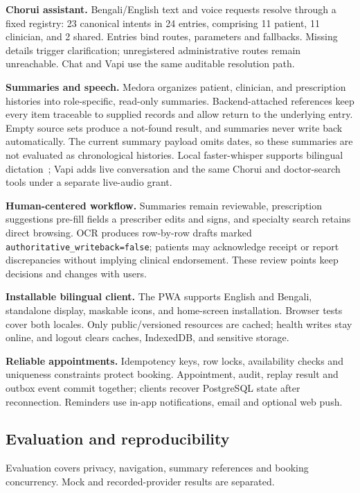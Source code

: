 \documentclass[preprint,12pt,a4paper]{elsarticle}
\begin{document}
\textbf{Chorui assistant.} Bengali/English text and voice requests resolve through a fixed
registry: 23 canonical intents in 24 entries, comprising 11 patient, 11
clinician, and 2 shared. Entries bind routes, parameters and fallbacks. Missing details
trigger clarification; unregistered administrative routes remain unreachable.
Chat and Vapi use the same auditable resolution path.

\textbf{Summaries and speech.} Medora organizes patient, clinician, and prescription
histories into role-specific, read-only summaries. Backend-attached references keep every
item traceable to supplied records and allow return to the underlying entry. Empty source
sets produce a not-found result, and summaries never write back automatically. The current
summary payload omits dates, so these summaries are not evaluated as chronological histories. Local
faster-whisper supports bilingual dictation~\cite{whisper}; Vapi adds live conversation and
the same Chorui and doctor-search tools under a separate live-audio grant.

\textbf{Human-centered workflow.} Summaries remain reviewable, prescription suggestions
pre-fill fields a prescriber edits and signs, and specialty search retains direct browsing.
OCR produces row-by-row drafts marked \texttt{authoritative\_writeback=false}; patients may
acknowledge receipt or report discrepancies without implying clinical endorsement. These
review points keep decisions and changes with users.

\textbf{Installable bilingual client.} The PWA supports English and Bengali, standalone
display, maskable icons, and home-screen installation. Browser tests cover both locales.
Only public/versioned resources are cached; health writes stay online, and logout clears
caches, IndexedDB, and sensitive storage.

\textbf{Reliable appointments.} Idempotency keys, row locks, availability checks and
uniqueness constraints protect booking. Appointment, audit, replay result and outbox event
commit together; clients recover PostgreSQL state after reconnection. Reminders use in-app
notifications, email and optional web push.

\subsection{Evaluation and reproducibility}

Evaluation covers privacy, navigation, summary references and booking concurrency.
Mock and recorded-provider results are separated.
\end{document}
